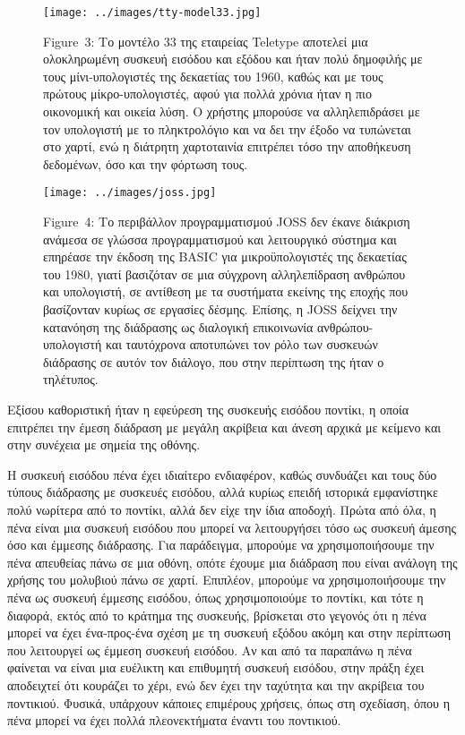 \documentclass[
]{article}
\begin{document}
\leavevmode{}%
\begin{figure}
\hypertarget{fig:tty-model33}{%
\centering
\texttt{[image: ../images/tty-model33.jpg]}
\caption{Figure~3: Το μοντέλο 33 της εταιρείας Teletype αποτελεί μια
ολοκληρωμένη συσκευή εισόδου και εξόδου και ήταν πολύ δημοφιλής με τους
μίνι-υπολογιστές της δεκαετίας του 1960, καθώς και με τους πρώτους
μίκρο-υπολογιστές, αφού για πολλά χρόνια ήταν η πιο οικονομική και
οικεία λύση. Ο χρήστης μπορούσε να αλληλεπιδράσει με τον υπολογιστή με
το πληκτρολόγιο και να δει την έξοδο να τυπώνεται στο χαρτί, ενώ η
διάτρητη χαρτοταινία επιτρέπει τόσο την αποθήκευση δεδομένων, όσο και
την φόρτωση τους.}\label{fig:tty-model33}
}
\end{figure}

\leavevmode{}%
\begin{figure}
\hypertarget{fig:joss}{%
\centering
\texttt{[image: ../images/joss.jpg]}
\caption{Figure~4: Το περιβάλλον προγραμματισμού JOSS δεν έκανε διάκριση
ανάμεσα σε γλώσσα προγραμματισμού και λειτουργικό σύστημα και επηρέασε
την έκδοση της BASIC για μικροϋπολογιστές της δεκαετίας του 1980, γιατί
βασιζόταν σε μια σύγχρονη αλληλεπίδραση ανθρώπου και υπολογιστή, σε
αντίθεση με τα συστήματα εκείνης της εποχής που βασίζονταν κυρίως σε
εργασίες δέσμης. Επίσης, η JOSS δείχνει την κατανόηση της διάδρασης ως
διαλογική επικοινωνία ανθρώπου-υπολογιστή και ταυτόχρονα αποτυπώνει τον
ρόλο των συσκευών διάδρασης σε αυτόν τον διάλογο, που στην περίπτωση της
ήταν ο τηλέτυπος.}\label{fig:joss}
}
\end{figure}

Εξίσου καθοριστική ήταν η εφεύρεση της συσκευής εισόδου ποντίκι, η οποία
επιτρέπει την έμεση διάδραση με μεγάλη ακρίβεια και άνεση αρχικά με
κείμενο και στην συνέχεια με σημεία της οθόνης.

Η συσκευή εισόδου πένα έχει ιδιαίτερο ενδιαφέρον, καθώς συνδυάζει και
τους δύο τύπους διάδρασης με συσκευές εισόδου, αλλά κυρίως επειδή
ιστορικά εμφανίστηκε πολύ νωρίτερα από το ποντίκι, αλλά δεν είχε την
ίδια αποδοχή. Πρώτα από όλα, η πένα είναι μια συσκευή εισόδου που μπορεί
να λειτουργήσει τόσο ως συσκευή άμεσης όσο και έμμεσης διάδρασης. Για
παράδειγμα, μπορούμε να χρησιμοποιήσουμε την πένα απευθείας πάνω σε μια
οθόνη, οπότε έχουμε μια διάδραση που είναι ανάλογη της χρήσης του
μολυβιού πάνω σε χαρτί. Επιπλέον, μπορούμε να χρησιμοποιήσουμε την πένα
ως συσκευή έμμεσης εισόδου, όπως χρησιμοποιούμε το ποντίκι, και τότε η
διαφορά, εκτός από το κράτημα της συσκευής, βρίσκεται στο γεγονός ότι η
πένα μπορεί να έχει ένα-προς-ένα σχέση με τη συσκευή εξόδου ακόμη και
στην περίπτωση που λειτουργεί ως έμμεση συσκευή εισόδου. Αν και από τα
παραπάνω η πένα φαίνεται να είναι μια ευέλικτη και επιθυμητή συσκευή
εισόδου, στην πράξη έχει αποδειχτεί ότι κουράζει το χέρι, ενώ δεν έχει
την ταχύτητα και την ακρίβεια του ποντικιού. Φυσικά, υπάρχουν κάποιες
επιμέρους χρήσεις, όπως στη σχεδίαση, όπου η πένα μπορεί να έχει πολλά
πλεονεκτήματα έναντι του ποντικιού.
\end{document}
